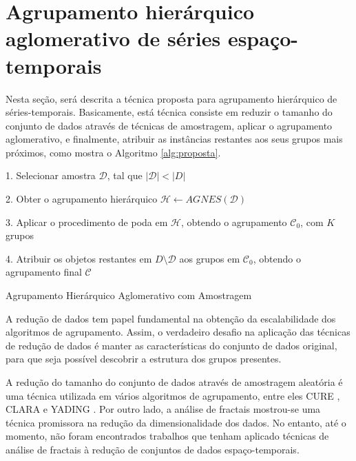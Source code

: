 \section{Agrupamento hierárquico aglomerativo de séries espaço-temporais}
	\label{sec:agrupamento_hierarquico}

Nesta seção, será descrita a técnica proposta para agrupamento hierárquico de
séries-temporais. Basicamente, está técnica consiste em reduzir o tamanho do
conjunto de dados através de técnicas de amostragem, aplicar o agrupamento
aglomerativo, e finalmente, atribuir as instâncias restantes aos seus grupos
mais próximos, como mostra o Algoritmo \ref{alg:proposta}.

\begin{algorithm}
	1. Selecionar amostra $\mathcal{D}$,
		tal que $\left|\mathcal{D}\right| < \left|D\right|$ \;
		
	2. Obter o agrupamento hierárquico
		$\mathcal{H} \gets AGNES\left(\mathcal{D}\right)$ \;
		
	3. Aplicar o procedimento de poda em $\mathcal{H}$, obtendo
		o agrupamento $\mathcal{C}_0$, com $K$ grupos \;
		
	4. Atribuir os objetos restantes em $D \setminus \mathcal{D}$
		aos grupos em $\mathcal{C}_0$, obtendo o agrupamento final $\mathcal{C}$ \;
	
	\caption{Agrupamento Hierárquico Aglomerativo com Amostragem}
	\label{alg:proposta}
\end{algorithm}

A redução de dados tem papel fundamental na obtenção da escalabilidade dos
algoritmos de agrupamento. Assim, o verdadeiro desafio na aplicação das técnicas
de redução de dados é manter as características do conjunto de dados original,
para que seja possível descobrir a estrutura dos grupos presentes.

A redução do tamanho do conjunto de dados através de amostragem aleatória é uma
técnica utilizada em vários algoritmos de agrupamento, entre eles CURE
\cite{guha1998cure}, CLARA \cite{kaufman1990finding} e YADING \cite{Ding2015}.
Por outro lado, a análise de fractais mostrou-se uma técnica promissora na 
redução da dimensionalidade dos dados. No entanto, até o momento, não foram
encontrados trabalhos que tenham aplicado técnicas de análise de fractais à
redução de conjuntos de dados espaço-temporais.
